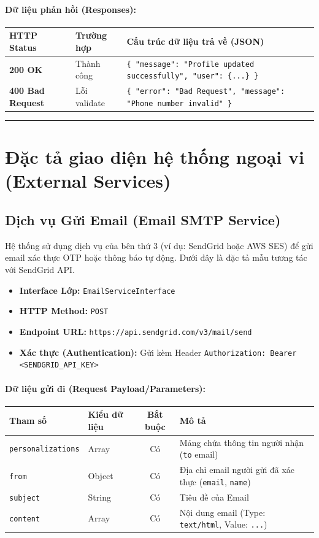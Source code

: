\documentclass[12pt,a4paper]{article}
\begin{document}
\paragraph{Dữ liệu phản hồi (Responses):}
\begin{longtable}{|p{2.8cm}|p{3.2cm}|p{8.0cm}|}
\hline
\textbf{HTTP Status} & \textbf{Trường hợp} & \textbf{Cấu trúc dữ liệu trả về (JSON)} \\ \hline
\endhead
\textbf{200 OK} & Thành công & \texttt{\{ "message": "Profile updated successfully", "user": \{...\} \}} \\ \hline
\textbf{400 Bad Request} & Lỗi validate & \texttt{\{ "error": "Bad Request", "message": "Phone number invalid" \}} \\ \hline
\end{longtable}

\vskip 0.4cm
\noindent\rule{\textwidth}{0.3pt}
\vskip 0.4cm

\newpage
\section{Đặc tả giao diện hệ thống ngoại vi (External Services)}

\subsection{Dịch vụ Gửi Email (Email SMTP Service)}
Hệ thống sử dụng dịch vụ của bên thứ 3 (ví dụ: SendGrid hoặc AWS SES) để gửi email xác thực OTP hoặc thông báo tự động. Dưới đây là đặc tả mẫu tương tác với SendGrid API.

\begin{itemize}[leftmargin=*]
    \item \textbf{Interface Lớp:} \texttt{EmailServiceInterface}
    \item \textbf{HTTP Method:} \texttt{POST}
    \item \textbf{Endpoint URL:} \texttt{https://api.sendgrid.com/v3/mail/send}
    \item \textbf{Xác thực (Authentication):} Gửi kèm Header \texttt{Authorization: Bearer \textless{}SENDGRID\_API\_KEY\textgreater{}}
\end{itemize}

\paragraph{Dữ liệu gửi đi (Request Payload/Parameters):}
\begin{longtable}{|p{2.8cm}|p{2.2cm}|c|p{7.0cm}|}
\hline
\textbf{Tham số} & \textbf{Kiểu dữ liệu} & \textbf{Bắt buộc} & \textbf{Mô tả} \\ \hline
\endhead
\texttt{personalizations} & Array & Có & Mảng chứa thông tin người nhận (\texttt{to} email) \\ \hline
\texttt{from} & Object & Có & Địa chỉ email người gửi đã xác thực (\texttt{email}, \texttt{name}) \\ \hline
\texttt{subject} & String & Có & Tiêu đề của Email \\ \hline
\texttt{content} & Array & Có & Nội dung email (Type: \texttt{text/html}, Value: \texttt{...}) \\ \hline
\end{longtable}
\end{document}

